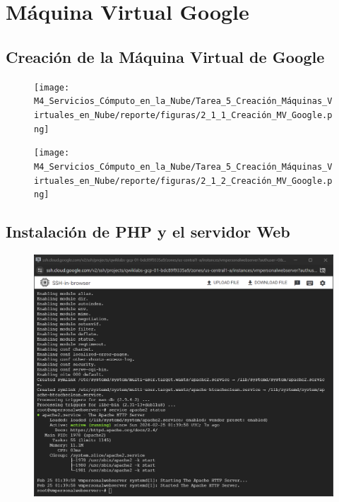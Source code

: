 \documentclass[12pt,a4paper]{article}
\begin{document}
\section{Máquina Virtual Google}

\subsection{Creación de la Máquina Virtual de Google}

\begin{figure}[H]
    \centering
    \texttt{[image: M4\_Servicios\_Cómputo\_en\_la\_Nube/Tarea\_5\_Creación\_Máquinas\_Virtuales\_en\_Nube/reporte/figuras/2\_1\_1\_Creación\_MV\_Google.png]}
    \label{fig:Google_1}
\end{figure}

\begin{figure}[H]
    \centering
    \texttt{[image: M4\_Servicios\_Cómputo\_en\_la\_Nube/Tarea\_5\_Creación\_Máquinas\_Virtuales\_en\_Nube/reporte/figuras/2\_1\_2\_Creación\_MV\_Google.png]}
    \label{fig:Google_2}
\end{figure}

\subsection{Instalación de PHP y el servidor Web}

\begin{figure}[H]
    \centering
    \includegraphics[width=1\linewidth]{M4_Servicios_Cómputo_en_la_Nube/Tarea_5_Creación_Máquinas_Virtuales_en_Nube/reporte/figuras/2_2_1_PHP_servidor_Web.png}
    \label{fig:Google_3}
\end{figure}
\end{document}
